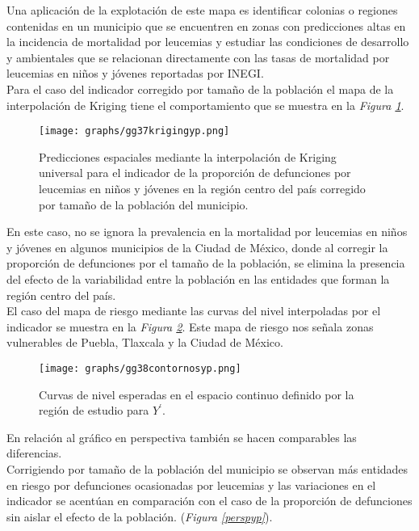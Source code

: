 \documentclass[11pt, oneside]{book}
\begin{document}
Una aplicación de la explotación de este mapa es identificar colonias o regiones contenidas en un municipio que se encuentren en zonas con predicciones altas en la incidencia de mortalidad por leucemias y estudiar las condiciones de desarrollo y ambientales que se relacionan directamente con las tasas de mortalidad por leucemias en niños y jóvenes reportadas por INEGI.\\

Para el caso del indicador corregido por tamaño de la población el mapa de la interpolación de Kriging tiene el comportamiento que se muestra en la \emph{Figura \ref{rasteryp}}. 

\begin{figure}[!ht]
    \centering
    \texttt{[image: graphs/gg37krigingyp.png]}
  \caption{Predicciones espaciales mediante la interpolación de Kriging universal para el indicador de la proporción de defunciones por leucemias en niños y jóvenes en la región centro del país corregido por tamaño de la población del municipio.}
  \label{rasteryp}
\end{figure}

En este caso, no se ignora la prevalencia en la mortalidad por leucemias en niños y jóvenes en algunos municipios de la Ciudad de México, donde al corregir la proporción de defunciones por el tamaño de la población, se elimina la presencia del efecto de la variabilidad entre la población en las entidades que forman la región centro del país.\\

El caso del mapa de riesgo mediante las curvas del nivel interpoladas por el indicador se muestra en la \emph{Figura \ref{curvasyp}}. Este mapa de riesgo nos señala zonas vulnerables de Puebla, Tlaxcala y la Ciudad de México.\\

\begin{figure}[!ht]
    \centering
    \texttt{[image: graphs/gg38contornosyp.png]}
  \caption{Curvas de nivel esperadas en el espacio continuo definido por la región de estudio para $Y^{'}$.}
  \label{curvasyp}
\end{figure}

En relación al gráfico en perspectiva también se hacen comparables las diferencias.\\ 

Corrigiendo por tamaño de la población del municipio se observan más entidades en riesgo por defunciones ocasionadas por leucemias y las variaciones en el indicador se acentúan en comparación con el caso de la proporción de defunciones sin aislar el efecto de la población. (\emph{Figura \ref{perspyp}}).\\
\end{document}
